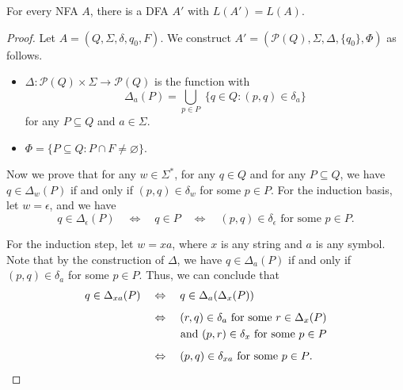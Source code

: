 \begin{theorem}
  For every NFA $A$, there is a DFA $A'$ with $L(A') = L(A)$.
\end{theorem}
\begin{proof}
  Let $A = (Q, \Sigma, \delta, q_0, F)$.
  We construct $A' = (\mathcal{P}(Q), \Sigma, \Delta, \{q_0\}, \Phi)$
  as follows.
  \begin{itemize}
    \item $\Delta: \mathcal{P}(Q) \times \Sigma \to \mathcal{P}(Q)$ is the
    function with
    \begin{equation*}
      \Delta_a(P) = \bigcup_{p \in P} \; \{q \in Q: (p, q) \in \delta_a\}
    \end{equation*}
    for any $P \subseteq Q$ and $a \in \Sigma$.
    \item $\Phi = \{P \subseteq Q: P \cap F \neq \varnothing\}$.
  \end{itemize}
  Now we prove that for any $w \in \Sigma^*$, for any $q \in Q$ and for any
  $P \subseteq Q$, we have $q \in \Delta_w(P)$ if and only if
  $(p, q) \in \delta_w$ for some $p \in P$.
  For the induction basis, let $w = \epsilon$, and we have
  \begin{equation*}
    q \in \Delta_\epsilon(P)
    \quad \Leftrightarrow \quad
    q \in P
    \quad \Leftrightarrow \quad
    \text{$(p, q) \in \delta_\epsilon$ for some $p \in P$}.
  \end{equation*}

  For the induction step, let $w = xa$, where $x$ is any string and $a$ is any
  symbol.
  Note that by the construction of $\Delta$, we have $q \in \Delta_a(P)$ if and
  only if $(p, q) \in \delta_a$ for some $p \in P$.
  Thus, we can conclude that
  \begin{align*}
    q \in \Delta_{xa}(P)
    \quad &\Leftrightarrow \quad
    q \in \Delta_a(\Delta_x(P)) \\[.5em]
    \quad &\Leftrightarrow \quad
    \text{$(r, q) \in \delta_a$ for some $r \in \Delta_x(P)$} \\
    &\hspace*{2.6em} \text{and $(p, r) \in \delta_x$ for some $p \in P$}
    \\[.5em]
    \quad &\Leftrightarrow \quad
    \text{$(p, q) \in \delta_{xa}$ for some $p \in P$}.
  \end{align*}


\end{proof}
